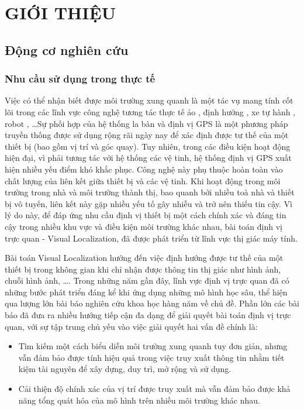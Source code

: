 \chapter{GIỚI THIỆU}

\section{Động cơ nghiên cứu}

\subsection{Nhu cầu sử dụng trong thực tế}

Việc có thể nhận biết được môi trường xung quanh là một tác vụ mang tính cốt lõi trong các lĩnh vực công nghệ tương tác thực tế ảo \cite{middelberg2014scalable}, định hướng \cite{sarlin2023orienternet}, xe tự hành \cite{chaabane2021end}, robot \cite{sunderhauf2015place}, \dots Sự phối hợp của hệ thống la bàn và định vị GPS là một phương pháp truyền thống được sử dụng rộng rãi ngày nay để xác định được tư thế của một thiết bị (bao gồm vị trí và góc quay). Tuy nhiên, trong các điều kiện hoạt động hiện đại, vì phải tương tác với hệ thống các vệ tinh, hệ thống định vị GPS xuất hiện nhiều yếu điểm khó khắc phục. Công nghệ này phụ thuộc hoàn toàn vào chất lượng của liên kết giữa thiết bị và các vệ tinh. Khi hoạt động trong môi trường trong nhà và môi trường thành thị, bao quanh bởi nhiều toà nhà và thiết bị vô tuyến, liên kết này gặp nhiều yếu tố gây nhiễu và trở nên thiếu tin cậy. Vì lý do này, để đáp ứng nhu cầu định vị thiết bị một cách chính xác và đáng tin cậy trong nhiều khu vực và điều kiện môi trường khác nhau, bài toán định vị trực quan - Visual Localization, đã được phát triển từ lĩnh vực thị giác máy tính.

Bài toán Visual Localization hướng đến việc định hướng được tư thế của một thiết bị trong không gian khi chỉ nhận được thông tin thị giác như hình ảnh, chuỗi hình ảnh, \dots. Trong những năm gần đây, lĩnh vực định vị trực quan đã có những bước phát triển đáng kể khi ứng dụng những mô hình học sâu, thể hiện qua lượng lớn bài báo nghiên cứu khoa học hàng năm về chủ đề. Phần lớn các bài báo đã đưa ra nhiều hướng tiếp cận đa dạng để giải quyết bài toán định vị trực quan, với sự tập trung chủ yếu vào việc giải quyết hai vấn đề chính là:
\begin{itemize}
  \item Tìm kiếm một cách biểu diễn môi trường xung quanh tuy đơn giản, nhưng vẫn đảm bảo được tính hiệu quả trong việc truy xuất thông tin nhằm tiết kiệm tài nguyên để xây dựng, duy trì, mở rộng và sử dụng.
  \item Cải thiện độ chính xác của vị trí được truy xuất mà vẫn đảm bảo được khả năng tổng quát hóa của mô hình trên nhiều môi trường khác nhau.
\end{itemize}

